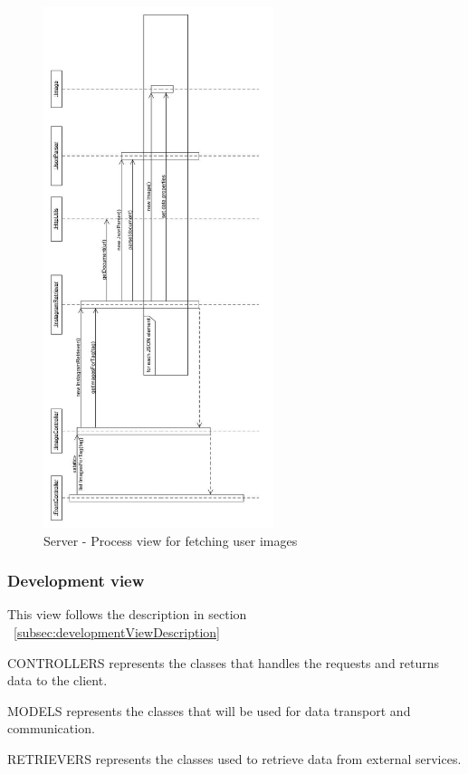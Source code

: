 \documentclass[11pt]{book}
\begin{document}
\begin{figure}[H]
      \centering
      \includegraphics[width=0.6\textwidth]{Figures/Architecture/Sequence/image.jpg}
      \caption{Server - Process view for fetching user images}
      \label{fig:arch_server_process_image}
\end{figure}

\subsubsection{Development view}
This view follows the description in section ~\ref{subsec:developmentViewDescription}

CONTROLLERS represents the classes that handles the requests and returns data to the client.

MODELS represents the classes that will be used for data transport and communication.

RETRIEVERS represents the classes used to retrieve data from external services.
\end{document}
